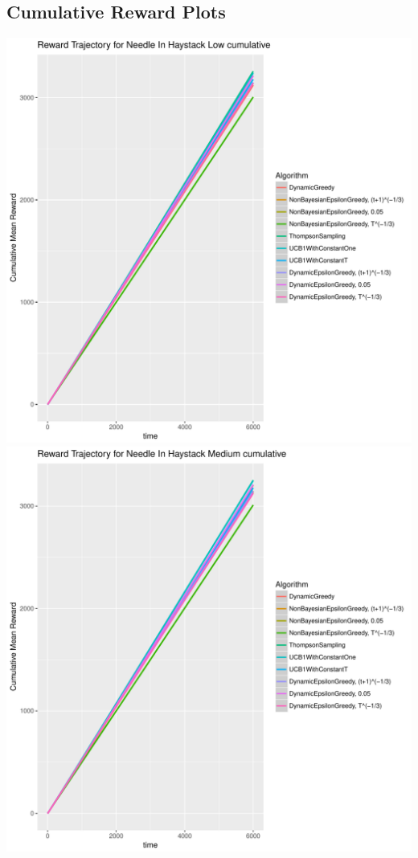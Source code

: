 \documentclass[11pt,letterpaper]{article}
\begin{document}
\subsection*{Cumulative Reward Plots}
\includegraphics[scale=0.5]{"../results/Reward Trajectory for Needle In Haystack Low cumulative"} \\
\includegraphics[scale=0.5]{"../results/Reward Trajectory for Needle In Haystack Medium cumulative"} \\
\end{document}
